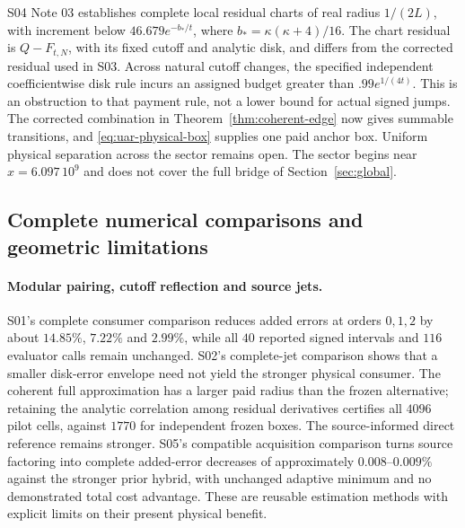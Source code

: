{S04 Note 03} establishes complete local residual charts of real radius
$1/(2L)$, with increment below $46.679e^{-b_*/t}$, where
$b_*=\kappa(\kappa+4)/16$. The chart residual is
$Q-F_{t,N}$, with its fixed cutoff and analytic disk, and differs from
the corrected residual used in S03. Across natural cutoff changes, the
specified independent coefficientwise disk rule incurs an assigned budget
greater than $.99e^{1/(4t)}$. This is an obstruction to that payment rule,
not a lower bound for actual signed jumps.
The corrected combination in Theorem~\ref{thm:coherent-edge} now gives
summable transitions, and \eqref{eq:uar-physical-box} supplies one paid
anchor box. Uniform physical separation across the sector remains open.
The sector begins near $x=6.097\,10^9$ and does not cover the full bridge
of Section~\ref{sec:global}.

\subsection{Complete numerical comparisons and geometric limitations}

\paragraph{Modular pairing, cutoff reflection and source jets.}
{S01's complete consumer comparison} reduces added errors at orders
$0,1,2$ by about $14.85\%$, $7.22\%$ and $2.99\%$, while all $40$
reported signed intervals and $116$ evaluator calls remain unchanged.
{S02's complete-jet comparison} shows that a smaller disk-error envelope
need not yield the stronger physical consumer. The coherent full
approximation has a larger paid radius than the frozen alternative;
retaining the analytic correlation among residual derivatives certifies
all $4096$ pilot cells, against $1770$ for independent frozen boxes.
The source-informed direct reference remains stronger.
{S05's compatible acquisition comparison} turns source factoring into
complete added-error decreases of approximately $0.008$--$0.009\%$
against the stronger prior hybrid, with unchanged adaptive minimum and
no demonstrated total cost advantage. These are reusable estimation
methods with explicit limits on their present physical benefit.

